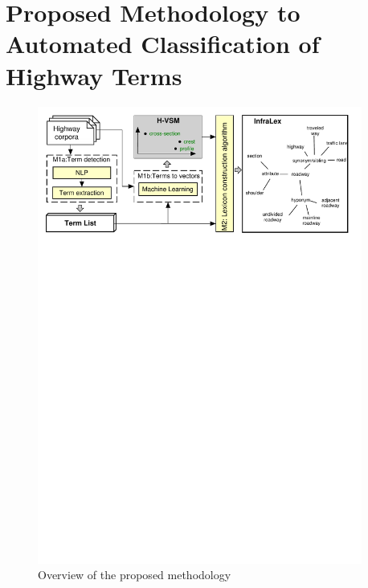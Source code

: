 \documentclass[Journal,InsideFigs, DoubleSpace]{ascelike} %
\begin{document}
\section{Proposed Methodology to Automated Classification of Highway Terms} \label{sec:RoadLex}
\begin{figure}[t]
	\centering
	\includegraphics[width=0.95\textwidth]{Figure1_overview_methodology}
	\caption{Overview of the proposed methodology}
	\label{fig:framework}
\end{figure}
%
\end{document}
